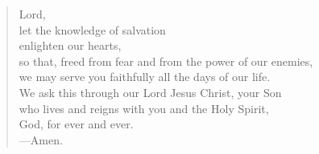 \prayer

\setlength{\vleftmargin}{\prayerleftmargini}

\begin{verse}
Lord,\\
let the knowledge of salvation\\
enlighten our hearts,\\
so that, freed from fear and from the power of our enemies,\\
we may serve you faithfully all the days of our life.\\
We ask this through our Lord Jesus Christ, your Son\\
who lives and reigns with you and the Holy Spirit,\\
God, for ever and ever.\\
{\color{red}---\thinspace}Amen.
\end{verse}

\setlength{\vleftmargin}{\defleftmargini}